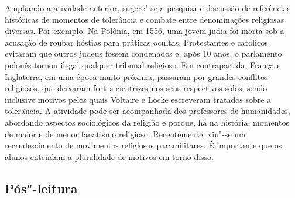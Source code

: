 \documentclass[12pt]{extarticle}
\begin{document}

Ampliando a atividade anterior, sugere"-se a pesquisa e
discussão de referências históricas de momentos de tolerância e combate
entre denominações religiosas diversas. Por exemplo: Na Polônia, em
1556, uma jovem judia foi morta sob a acusação de roubar hóstias para
práticas ocultas. Protestantes e católicos evitaram que outros judeus
fossem condenados e, após 10 anos, o parlamento polonês tornou ilegal
qualquer tribunal religioso. Em contrapartida, França e Inglaterra, em
uma época muito próxima, passaram por grandes conflitos religiosos, que
deixaram fortes cicatrizes nos seus respectivos solos, sendo inclusive
motivos pelos quais Voltaire e Locke escreveram tratados sobre a
tolerância. A atividade pode ser acompanhada dos professores de
humanidades, abordando aspectos sociológicos da religião e porque, há na
história, momentos de maior e de menor fanatismo religioso.
Recentemente, viu"-se um recrudescimento de movimentos religiosos
paramilitares. É importante que os alunos entendam a pluralidade de
motivos em torno disso.

\subsection{Pós"-leitura}
\end{document}
